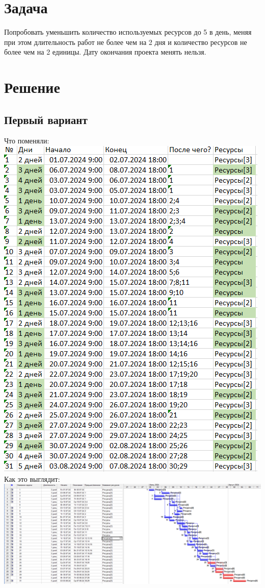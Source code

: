 \documentclass[14pt]{article}
\begin{document}
\section{Задача}
	Попробовать уменьшить количество используемых ресурсов до 5 в день,
		меняя при этом длительность работ не более чем на 2 дня и количество ресурсов не более чем на 2 единицы.
	Дату окончания проекта менять нельзя.
\section{Решение}
	\subsection{Первый вариант}
		{\LARGE Что поменяли:}\\
		\includegraphics[height=0.6\textheight]{../img/1b1_days_change.png}\\ 
		{\LARGE Как это выглядит:}\\
		\includegraphics[width=\textwidth]{../img/ot1b1_1.png}\\
\end{document}
